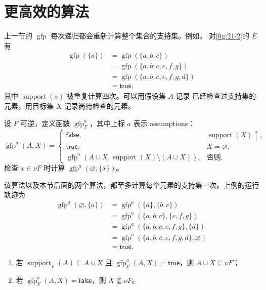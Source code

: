 \section{更高效的算法}
\label{sec:21.6}

上一节的 \(\operatorname{gfp}\) 每次递归都会重新计算整个集合的支持集。例如，
对\cref{fig:21-2}的 \(E\) 有
\[
\begin{aligned}
\operatorname{gfp}(\{a\})
&=\operatorname{gfp}(\{a,b,c\})\\
&=\operatorname{gfp}(\{a,b,c,e,f,g\})\\
&=\operatorname{gfp}(\{a,b,c,e,f,g,d\})\\
&=\mathsf{true},
\end{aligned}
\]
其中 \(\operatorname{support}(a)\) 被重复计算四次。可以用假设集 \(A\) 记录
已经检查过支持集的元素，用目标集 \(X\) 记录尚待检查的元素。

\begin{definition}
\label{def:21.6.1}
设 \(F\) 可逆，定义函数 \(\operatorname{gfp}_F^a\)，其中上标 \(a\) 表示
assumptions：
\[
\operatorname{gfp}^a(A,X)=
\begin{cases}
\mathsf{false},&\operatorname{support}(X)\uparrow,\\
\mathsf{true},&X=\varnothing,\\
\operatorname{gfp}^a(A\cup X,
  \operatorname{support}(X)\setminus(A\cup X)),&\text{否则}.
\end{cases}
\]
检查 \(x\in\nu F\) 时计算 \(\operatorname{gfp}^a(\varnothing,\{x\})\)。
\end{definition}

该算法以及本节后面的两个算法，都至多计算每个元素的支持集一次。上例的运行
轨迹为
\[
\begin{aligned}
\operatorname{gfp}^a(\varnothing,\{a\})
&=\operatorname{gfp}^a(\{a\},\{b,c\})\\
&=\operatorname{gfp}^a(\{a,b,c\},\{e,f,g\})\\
&=\operatorname{gfp}^a(\{a,b,c,e,f,g\},\{d\})\\
&=\operatorname{gfp}^a(\{a,b,c,e,f,g,d\},\varnothing)\\
&=\mathsf{true}.
\end{aligned}
\]

\taplstatementliststart
\begin{theorem}
\label{thm:21.6.2}
\taplstatementlistbreak
\begin{enumerate}
  \item 若 \(\operatorname{support}_F(A)\subseteq A\cup X\) 且
        \(\operatorname{gfp}_F^a(A,X)=\mathsf{true}\)，则
        \(A\cup X\subseteq\nu F\)；
  \item 若 \(\operatorname{gfp}_F^a(A,X)=\mathsf{false}\)，则
        \(X\not\subseteq\nu F\)。
\end{enumerate}
\end{theorem}

